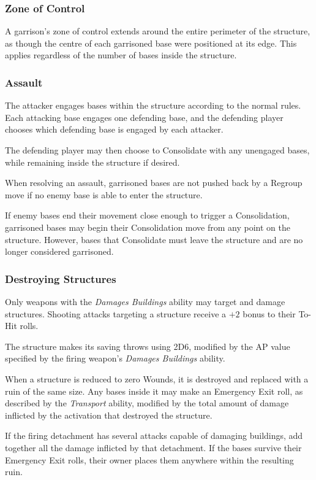 \subsubsection{Zone of Control}

A garrison's zone of control extends around the entire perimeter of the structure, as though the centre of each garrisoned base were positioned at its edge. This applies regardless of the number of bases inside the structure.

\subsubsection{Assault}

The attacker engages bases within the structure according to the normal rules. Each attacking base engages one defending base, and the defending player chooses which defending base is engaged by each attacker.

The defending player may then choose to Consolidate with any unengaged bases, while remaining inside the structure if desired.

When resolving an assault, garrisoned bases are not pushed back by a Regroup move if no enemy base is able to enter the structure.

If enemy bases end their movement close enough to trigger a Consolidation, garrisoned bases may begin their Consolidation move from any point on the structure. However, bases that Consolidate must leave the structure and are no longer considered garrisoned.

\subsubsection{Destroying Structures}

Only weapons with the \textit{Damages Buildings} ability may target and damage structures. Shooting attacks targeting a structure receive a $+2$ bonus to their To-Hit rolls.

The structure makes its saving throws using 2D6, modified by the AP value specified by the firing weapon's \textit{Damages Buildings} ability.

When a structure is reduced to zero Wounds, it is destroyed and replaced with a ruin of the same size. Any bases inside it may make an Emergency Exit roll, as described by the \textit{Transport} ability, modified by the total amount of damage inflicted by the activation that destroyed the structure.

If the firing detachment has several attacks capable of damaging buildings, add together all the damage inflicted by that detachment. If the bases survive their Emergency Exit rolls, their owner places them anywhere within the resulting ruin.

